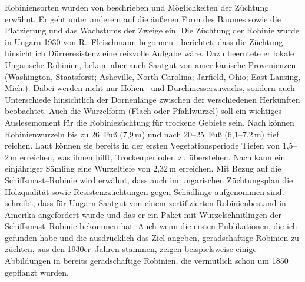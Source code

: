 \documentclass[twocolumn]{scrartcl}
\begin{document}
Robiniensorten wurden von \citet{vilmos1908robiniensorten} beschrieben
und Möglichkeiten der Züchtung erwähnt. Er geht unter anderem auf die
äußeren Form des Baumes sowie die Platzierung und das Wachstums der
Zweige ein.
Die Züchtung der Robinie wurde in Ungarn 1930 von R.~Fleischmann
begonnen \citep{keresztesi1983robinie}. \citet{fleischmann1933robinie}
berichtet, dass die Züchtung hinsichtlich Dürreresistenz eine
reizvolle Aufgabe wäre. Dazu beerntete er lokale Ungarische Robinien,
bekam aber auch Saatgut von amerikanische Provenienzen (Washington,
Staatsforst; Asheville, North Carolina; Jarfield, Ohio; East Lansing,
Mich.). %
Dabei werden nicht nur Höhen-- und Durchmesserzuwachs, sondern auch
Unterschiede hinsichtlich der Dornenlänge zwischen der verschiedenen
Herkünften beobachtet.
Auch die Wurzelform (Flach oder Pfahlwurzel) soll ein wichtiges Auslesemoment
für die Robiniezüchtung für trockene Gebiete sein.
Nach \citet{bunger1938robinieWurzeltiefe} können Robinienwurzeln
bis zu 26~Fuß (7{,}9\,m) und nach
\citet[S.~424]{harlow2000dendrology} 20--25~Fuß (6,1--7,2\,m) tief reichen.
Laut \citet{lyr1967wurzel}
können sie bereits in der ersten Vegetationsperiode Tiefen von
1{,}5--2\,m erreichen, was ihnen hilft, Trockenperioden zu überstehen.
Nach \citet[S.~38]{bluemke1955robinie} kann ein einjähriger Sämling eine
Wurzeltiefe von 2,32\,m erreichen.
Mit Bezug auf die
Schiffsmast--Robinie \citep{raber1936shipmast} wird erwähnt, dass auch im
ungarischen Züchtungsplan die Holzqualität sowie Resistenzzüchtungen gegen
Schädlinge aufgenommen sind. \citet{mihalyi1937robinie} schreibt, dass für Ungarn
Saatgut von einem zertifizierten Robinienbestand in Amerika angefordert wurde
und das er ein Paket mit Wurzelschnitlingen der Schiffsmast--Robinie bekommen
hat.
Auch wenn die ersten Publikationen, die ich gefunden habe und die
ausdrücklich das Ziel angeben, geradschaftige Robinien zu züchten, aus den
1930er--Jahren stammen, zeigen beispielsweise einige Abbildungen in
\citet{vadas1911robinie} bereits geradschaftige Robinien, die vermutlich schon um
1850 gepflanzt wurden.
\end{document}
